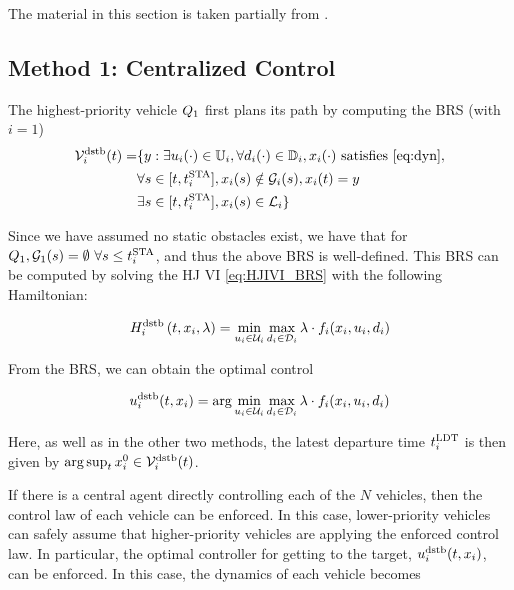 The material in this section is taken partially from \cite{Bansal2017}.

\subsection{Method 1: Centralized Control \label{sec:cc}}
The highest-priority vehicle $Q_1$ first plans its path by computing the BRS (with $i=1$)
\begin{equation}
\label{eq:BRS}
\begin{aligned}
\brs_i^\text{dstb}(t) = & \{y: \exists \ctrl_i(\cdot) \in \cfset_i, \forall \dstb_i(\cdot) \in \dfset_i, \state_i(\cdot) \text{ satisfies \eqref{eq:dyn}},\\
& \forall s \in [t, \sta_i], \state_i(s) \notin \obsset_i(s), \state_i(t) = y\\
& \exists s \in [t, \sta_i], \state_i(s) \in \targetset_i\}
\end{aligned}
\end{equation}

Since we have assumed no static obstacles exist, we have that for $Q_1, \mathcal{G}_1(s)=\emptyset ~ \forall s \le t^\text{STA}_i$, and thus the above BRS is well-defined. This BRS can be computed by solving the HJ VI \eqref{eq:HJIVI_BRS} with the following Hamiltonian:

\begin{equation}
H_i^\text{dstb}\left(t, x_i, \lambda\right) = \min_{u_i \in \mathcal{U}_i} \max_{d_i \in \mathcal{D}_i} \lambda \cdot f_i(x_i, u_i, d_i)
\end{equation}

From the BRS, we can obtain the optimal control

\begin{equation}
\label{eq:opt_ctrl_i}
\ctrl_i^\text{dstb}(t,\state_i) =  \arg \min_{\ctrl_i \in \cset_i} \max_{\dstb_i \in \dset_i} \costate \cdot \fdyn_i(\state_i, \ctrl_i, \dstb_i)
\end{equation}

Here, as well as in the other two methods, the latest departure time $t^\text{LDT}_i$ is then given by $\arg \sup_t x_{i}^0 \in \mathcal{V}_i^\text{dstb}(t)$.

If there is a central agent directly controlling each of the $N$ vehicles, then the control law of each vehicle can be enforced. In this case, lower-priority vehicles can safely assume that higher-priority vehicles are applying the enforced control law. In particular, the optimal controller for getting to the target, $u^\text{dstb}_i(t, x_i)$, can be enforced. In this case, the dynamics of each vehicle becomes 

